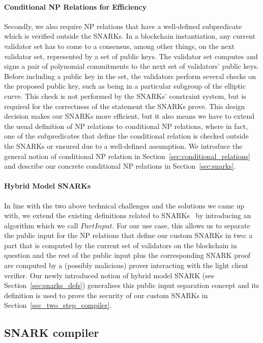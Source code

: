 \paragraph{Conditional NP Relations for Efficiency} Secondly, we also require NP relations that have a well-defined subpredicate which is verified outside the SNARKs. In a blockchain instantiation, 
any current validator set has to come to a consensus, among other things, on the next validator set, represented by a set of public keys. The validator set 
computes and signs a pair of polynomial commitments to the next set of validators' public keys. Before including a public key in the set, the validators perform several 
checks on the proposed public key, such as being in a particular subgroup of the elliptic curve. This check is not performed by the SNARKs' constraint system, but is 
required for the correctness of the statement the SNARKs prove. This design decision makes our SNARKs more efficient, but it also means we have to extend the 
usual definition of NP relations to conditional NP relations, where in fact, one of the subpredicates that define the conditional relation is checked outside the SNARKs 
or ensured due to a well-defined assumption. We introduce the general notion of conditional NP relation in Section~\ref{sec:conditional_relations} and describe our 
concrete conditional NP relations in Section~\ref{sec:snarks}.   

\paragraph{Hybrid Model SNARKs} In line with the two above technical challenges and the solutions we came up with, we extend the existing definitions 
related to SNARKs~\cite{groth16,plonk} by introducing an algorithm which we call $\mathit{PartInput}$. For our use case, this allows us to separate the public input for the NP relations that define our custom SNARKs in two: a part 
that is computed by the current set of validators on the blockchain in question and the rest of the public input plus the corresponding SNARK proof are 
computed by a (possibly malicious) prover interacting with the light client verifier. Our newly introduced notion of hybrid model SNARK (see Section~\ref{sec:snarks_defs}) 
generalises this public input separation concept and its definition is used to prove the security of our custom SNARKs in Section~\ref{sec_two_step_compiler}.

\subsection{SNARK compiler}

